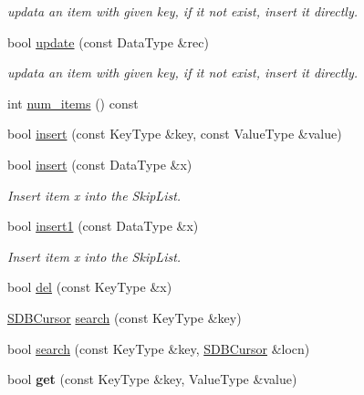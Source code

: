 \begin{CompactItemize}
\begin{CompactList}\small\item\em updata an item with given key, if it not exist, insert it directly. \item\end{CompactList}\item 
\hypertarget{classSkipListFile_ddf44609488c1a813b398ea39d521e0a}{
bool \hyperlink{classSkipListFile_ddf44609488c1a813b398ea39d521e0a}{update} (const DataType \&rec)}
\label{classSkipListFile_ddf44609488c1a813b398ea39d521e0a}

\begin{CompactList}\small\item\em updata an item with given key, if it not exist, insert it directly. \item\end{CompactList}\item 
int \hyperlink{classSkipListFile_c6c8ae57ca3914f78eb96251c1bdd9bc}{num\_\-items} () const 
\item 
bool \hyperlink{classSkipListFile_92adc503de42daa3192010f295c0570b}{insert} (const KeyType \&key, const ValueType \&value)
\item 
bool \hyperlink{classSkipListFile_8a284db41397e361e0f520521d6c8c1e}{insert} (const DataType \&x)
\begin{CompactList}\small\item\em Insert item x into the SkipList. \item\end{CompactList}\item 
\hypertarget{classSkipListFile_9db068a9162ac3f5f3c73e73b084bd58}{
bool \hyperlink{classSkipListFile_9db068a9162ac3f5f3c73e73b084bd58}{insert1} (const DataType \&x)}
\label{classSkipListFile_9db068a9162ac3f5f3c73e73b084bd58}

\begin{CompactList}\small\item\em Insert item x into the SkipList. \item\end{CompactList}\item 
bool \hyperlink{classSkipListFile_67061b1d6b1bda62005b93ca30686076}{del} (const KeyType \&x)
\item 
\hyperlink{classSkipNode}{SDBCursor} \hyperlink{classSkipListFile_b125e379a9640879f05386bb17ede4e2}{search} (const KeyType \&key)
\item 
bool \hyperlink{classSkipListFile_81d3a3d64e98032992514e3dff8b394d}{search} (const KeyType \&key, \hyperlink{classSkipNode}{SDBCursor} \&locn)
\item 
\hypertarget{classSkipListFile_a2d9e0f639fd99c0aa1f0155221058fc}{
bool \textbf{get} (const KeyType \&key, ValueType \&value)}
\label{classSkipListFile_a2d9e0f639fd99c0aa1f0155221058fc}


\end{CompactItemize}
